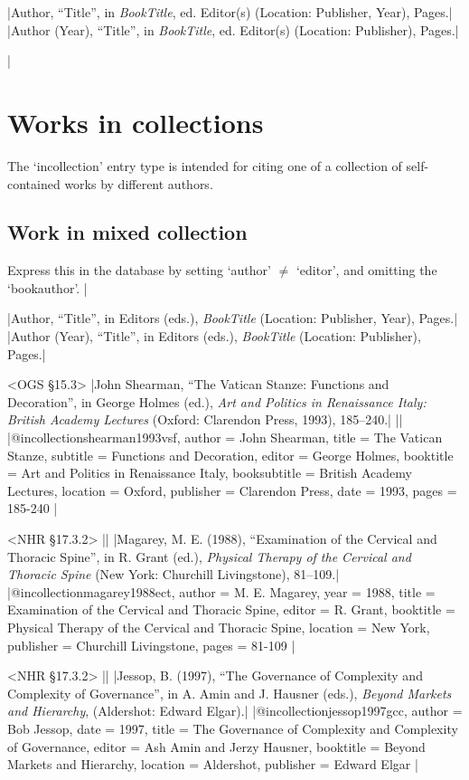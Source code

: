 \documentclass[extrafontsizes,11pt,a4paper,oneside]{memoir}
\newcommand*{\lit}[1]{\textsf{#1}}
\newcommand*{\code}[1]{`\textsf{#1}'}
\begin{document}
\specs
|Author, \enquote{Title}, \lit{in} \emph{BookTitle}, \lit{ed.} Editor(s) (Location: Publisher, Year), Pages.|%
|Author (Year), \enquote{Title}, \lit{in} \emph{BookTitle}, \lit{ed.} Editor(s) (Location: Publisher), Pages.|

\todoc|
\section{Works in collections}

The \code{incollection} entry type is intended for citing one of a collection of self-contained works by different authors.

\subsection{Work in mixed collection}

Express this in the database by setting \code{author} $\neq$ \code{editor}, and omitting the \code{bookauthor}.
|

\specs
|Author, \enquote{Title}, \lit{in} Editors (\lit{eds.}), \emph{BookTitle} (Location: Publisher, Year), Pages.|%
|Author (Year), \enquote{Title}, \lit{in} Editors (\lit{eds.}), \emph{BookTitle} (Location: Publisher), Pages.|

\bibexample<OGS \S15.3>
|John Shearman, \enquote{The Vatican Stanze: Functions and Decoration}, in George Holmes (ed.), \emph{Art and Politics in Renaissance Italy: British Academy Lectures} (Oxford: Clarendon Press, 1993), 185--240.|%
||%
|@incollection{shearman1993vsf,
  author = {John Shearman},
  title = {The Vatican Stanze},
  subtitle = {Functions and Decoration},
  editor = {George Holmes},
  booktitle = {Art and Politics in Renaissance Italy},
  booksubtitle = {British Academy Lectures},
  location = {Oxford},
  publisher = {Clarendon Press},
  date = {1993},
  pages = {185-240}
}|

\bibexample<NHR \S17.3.2>
||%
|Magarey, M. E. (1988), \enquote{Examination of the Cervical and Thoracic Spine}, in R. Grant (ed.), \emph{Physical Therapy of the Cervical and Thoracic Spine} (New York: Churchill Livingstone), 81–109.|%
|@incollection{magarey1988ect,
  author = {M. E. Magarey},
  year = {1988},
  title = {Examination of the Cervical and Thoracic Spine},
  editor = {R. Grant},
  booktitle = {Physical Therapy of the Cervical and Thoracic Spine},
  location = {New York},
  publisher = {Churchill Livingstone},
  pages = {81-109}
}|

\bibexample<NHR \S17.3.2>
||%
|Jessop, B. (1997), \enquote{The Governance of Complexity and Complexity of Governance}, in A. Amin and J. Hausner (eds.), \emph{Beyond Markets and Hierarchy}, (Aldershot: Edward Elgar).|%
|@incollection{jessop1997gcc,
  author = {Bob Jessop},
  date = {1997},
  title = {The Governance of Complexity and Complexity of Governance},
  editor = {Ash Amin and Jerzy Hausner},
  booktitle = {Beyond Markets and Hierarchy},
  location = {Aldershot},
  publisher = {Edward Elgar}
}|
\end{document}
